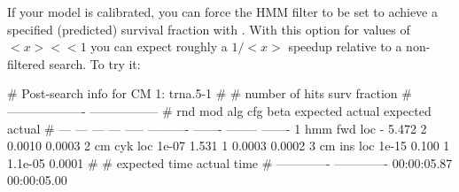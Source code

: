 If your model is calibrated, you can force the HMM filter to be set to
achieve a specified (predicted) survival fraction with
. With this option for values of $<x> << 1$
you can expect roughly a $1 / <x>$ speedup relative to a
non-filtered search. To try it: 



\begin{sreoutput}
# Post-search info for CM 1: trna.5-1
#
#                              number of hits       surv fraction  
#                            -------------------  -----------------
# rnd  mod  alg  cfg   beta    expected   actual  expected   actual
# ---  ---  ---  ---  -----  ----------  -------  --------  -------
    1  hmm  fwd  loc      -       5.472        2    0.0010   0.0003
    2   cm  cyk  loc  1e-07       1.531        1    0.0003   0.0002
    3   cm  ins  loc  1e-15       0.100        1   1.1e-05   0.0001
#
# expected time    actual time
# -------------  -------------
    00:00:05.87    00:00:05.00
\end{sreoutput}


